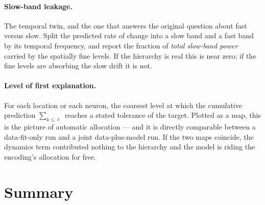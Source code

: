 \documentclass[11pt,a4paper]{article}
\begin{document}
\paragraph{Slow-band leakage.} The temporal twin, and the one that answers the original
question about fast versus slow. Split the predicted rate of change into a slow band and a
fast band by its temporal frequency, and report the fraction of \emph{total slow-band
power} carried by the spatially fine levels. If the hierarchy is real this is near zero;
if the fine levels are absorbing the slow drift it is not.

\paragraph{Level of first explanation.} For each location or each neuron, the coarsest
level at which the cumulative prediction $\sum_{k \le \ell}$ reaches a stated tolerance of
the target. Plotted as a map, this is the picture of automatic allocation --- and it is
directly comparable between a data-fit-only run and a joint data-plus-model run. If the two
maps coincide, the dynamics term contributed nothing to the hierarchy and the model is
riding the encoding's allocation for free.

\section{Summary}
\end{document}
